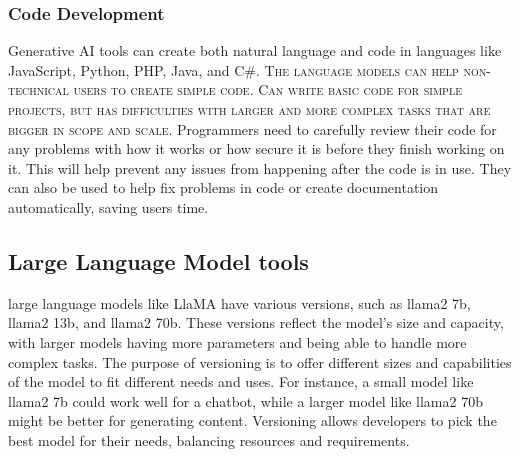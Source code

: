 \subsubsection{Code Development}
Generative AI tools can create both natural language and code in languages like JavaScript, Python, PHP, Java, and C\#.
\vskip 0.5cm
\textsc{The language models can help non-technical users  to create simple code. Can write basic code for simple projects, but has difficulties with larger and more complex tasks  that are bigger in scope and scale.}
\vskip 0.5cm
Programmers need to carefully review their code for any problems with how it works or how secure it is before they finish working on it. This will help prevent any issues from happening after the code is in use. They can also be used to help fix problems in code or create documentation automatically, saving users time.
\subsection{Large Language Model tools}
large language models like LlaMA have various versions, such as llama2 7b, llama2 13b, and llama2 70b. These versions reflect the model’s size and capacity, with larger models having more parameters and being able to handle more complex tasks. The purpose of versioning is to offer different sizes and capabilities of the model to fit different needs and uses. For instance, a small model like llama2 7b could work well for a chatbot, while a larger model like llama2 70b might be better for generating content. Versioning allows developers to pick the best model for their needs, balancing resources and requirements.

